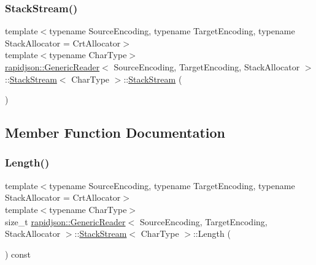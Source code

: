 \subsubsection{\texorpdfstring{StackStream()}{StackStream()}\hspace{0.1cm}{\footnotesize\ttfamily [2/2]}}
{\footnotesize\ttfamily template$<$typename Source\+Encoding, typename Target\+Encoding, typename Stack\+Allocator = Crt\+Allocator$>$ \\
template$<$typename Char\+Type$>$ \\
\mbox{\hyperlink{classrapidjson_1_1_generic_reader}{rapidjson\+::\+Generic\+Reader}}$<$ Source\+Encoding, Target\+Encoding, Stack\+Allocator $>$\+::\mbox{\hyperlink{classrapidjson_1_1_generic_reader_1_1_stack_stream}{Stack\+Stream}}$<$ Char\+Type $>$\+::\mbox{\hyperlink{classrapidjson_1_1_generic_reader_1_1_stack_stream}{Stack\+Stream}} (\begin{DoxyParamCaption}\item[{const \mbox{\hyperlink{classrapidjson_1_1_generic_reader_1_1_stack_stream}{Stack\+Stream}}$<$ Char\+Type $>$ \&}]{ }\end{DoxyParamCaption})\hspace{0.3cm}{\ttfamily [private]}}



\subsection{Member Function Documentation}
\mbox{\label{classrapidjson_1_1_generic_reader_1_1_stack_stream_a8e7a1a66d6602cbe3e290a94d1f99eb8}} 
\subsubsection{\texorpdfstring{Length()}{Length()}}
{\footnotesize\ttfamily template$<$typename Source\+Encoding, typename Target\+Encoding, typename Stack\+Allocator = Crt\+Allocator$>$ \\
template$<$typename Char\+Type$>$ \\
size\+\_\+t \mbox{\hyperlink{classrapidjson_1_1_generic_reader}{rapidjson\+::\+Generic\+Reader}}$<$ Source\+Encoding, Target\+Encoding, Stack\+Allocator $>$\+::\mbox{\hyperlink{classrapidjson_1_1_generic_reader_1_1_stack_stream}{Stack\+Stream}}$<$ Char\+Type $>$\+::Length (\begin{DoxyParamCaption}{ }\end{DoxyParamCaption}) const}



